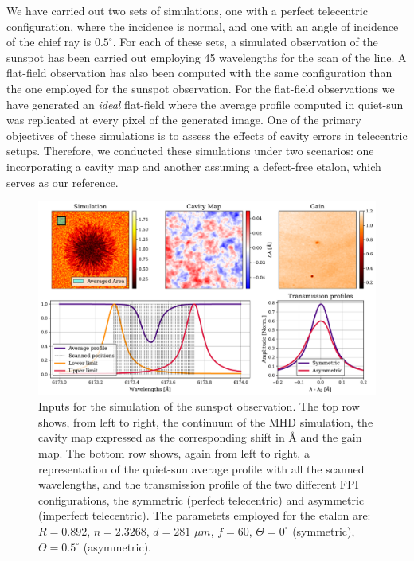We have carried out two sets of simulations, one with a perfect telecentric configuration, where the incidence is normal, and one with an angle of incidence of the chief ray is $0.5^\circ$. For each of these sets, a simulated observation of the sunspot has been carried out employing 45 wavelengths for the scan of the line. A flat-field observation has also been computed with the same configuration than the one employed for the sunspot observation. For the flat-field observations we have generated an \textit{ideal} flat-field where the average profile computed in quiet-sun was replicated at every pixel of the generated image. One of the primary objectives of these simulations is to assess the effects of cavity errors in telecentric setups. Therefore, we conducted these simulations under two scenarios: one incorporating a cavity map and another assuming a defect-free etalon, which serves as our reference.  

\begin{figure}
    \includegraphics[width=\textwidth]{figures/Mancha/Inputs_mancha.pdf}
    \caption{
      Inputs for the simulation of the sunspot observation. The top row shows, from left to right, the continuum of the MHD simulation, the cavity map expressed as the corresponding shift in \r{A} and the gain map. The bottom row shows, again from left to right, a representation of the quiet-sun average profile with all the scanned wavelengths, and the transmission profile of the two different FPI configurations, the symmetric (perfect telecentric) and asymmetric (imperfect telecentric). The parametets employed for the etalon are: $R=0.892$, $n = 2.3268$, $d = 281$ $\mu m$, $f = 60$, $\Theta = 0^{\circ}$ (symmetric), $\Theta = 0.5^{\circ}$ (asymmetric).
      \label{fig_mancha: Inputs}}
\end{figure}


